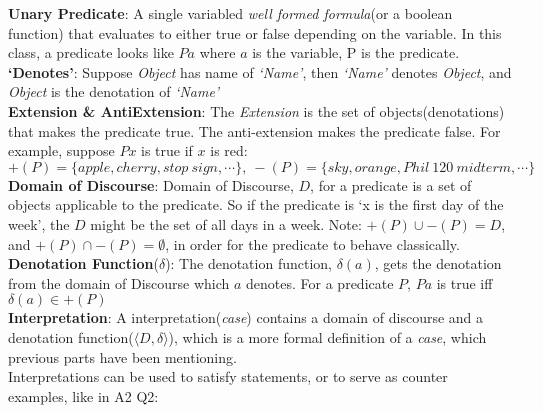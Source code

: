 \documentclass{article}
\begin{document}
\noindent
{\large

\textbf{Unary Predicate}: A single variabled \emph{well formed formula}(or a boolean function) that 
evaluates to either true or false depending on the variable. In this class, a predicate looks like $Pa$ 
where $a$ is the variable, P is the predicate.\\

\textbf{`Denotes'}: Suppose \emph{Object} has name of \emph{`Name'}, then \emph{`Name'} denotes 
\emph{Object}, and \emph{Object} is the denotation of \emph{`Name'}\\

\textbf{Extension \& AntiExtension}: The \emph{Extension} is the set of objects(denotations) that makes 
the predicate true. The anti-extension makes the predicate false. For example, suppose $Px$ is true 
if $x$ is red:
$$
+(P) = \{apple, cherry, stop \ sign, \dotsb\}, \ -(P) = \{sky, orange, Phil \ 120 \ midterm, \dotsb\}
$$
\textbf{Domain of Discourse}: Domain of Discourse, $D$, for a predicate is a set of objects applicable to the 
predicate. So if the predicate is `x is the first day of the week', the $D$ might be the set of all days in a week.
Note: $+(P)\cup-(P) = D$, and $+(P) \cap -(P) = \emptyset$, in order for the predicate to behave classically.\\

\textbf{Denotation Function}($\delta$): The denotation function, $\delta(a)$, gets the denotation from 
the domain of Discourse which $a$ denotes. For a predicate $P$, $Pa$ is true iff $\delta(a) \in +(P)$\\

\textbf{Interpretation}: A interpretation(\emph{case}) contains a domain of discourse and
a denotation function($\langle D, \delta \rangle$), which is a more formal definition of 
a \emph{case}, which previous parts have been mentioning.\\

Interpretations can be used to satisfy statements, or to serve as counter examples, like in A2 Q2:\\

}
\end{document}
